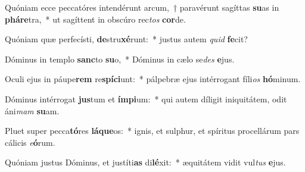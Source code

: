 \item Quóniam ecce peccatóres intendérunt arcum,~† paravérunt sagíttas \textbf{su}as in \textbf{phá}\textbf{re}tra,~* ut sagíttent in obscúro rec\textit{tos} \textbf{cor}de.
\item Quóniam quæ perfecísti, \textbf{de}stru\textbf{xé}runt:~* justus autem \textit{quid} \textbf{fe}cit?
\item Dóminus in templo \textbf{sanc}to \textbf{su}o,~* Dóminus in cælo se\textit{des} \textbf{e}jus.
\item Oculi ejus in páupe\textbf{rem} re\textbf{spí}\textbf{ci}unt:~* pálpebræ ejus intérrogant fíli\textit{os} \textbf{hó}minum.
\item Dóminus intérrogat \textbf{jus}tum et \textbf{ím}\textbf{pi}um:~* qui autem díligit iniquitátem, odit áni\textit{mam} \textbf{su}am.
\item Pluet super pecca\textbf{tó}res \textbf{lá}\textbf{que}os:~* ignis, et sulphur, et spíritus procellárum pars cálicis \textit{e}\textbf{ó}rum.
\item Quóniam justus Dóminus, et justíti\textbf{as} di\textbf{lé}xit:~* æquitátem vidit vul\textit{tus} \textbf{e}jus.
